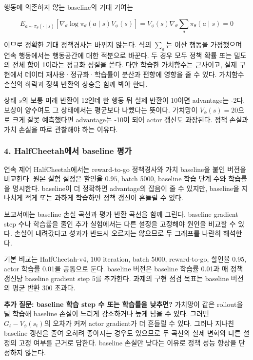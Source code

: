 \documentclass[11pt,a4paper]{article}
\begin{document}
행동에 의존하지 않는 baseline의 기대 기여는\par

\[
E_{a\sim\pi_\theta(\cdot\mid s)}
[\nabla_\theta\log\pi_\theta(a\mid s)V_\phi(s)]
=V_\phi(s)\nabla_\theta\sum_a\pi_\theta(a\mid s)=0
\]

이므로 정확한 기대 정책경사는 바뀌지 않는다. 식의 $\sum_a$는 이산 행동을 가정했으며 연속 행동에서는 행동공간에 대한 적분으로 바꾼다. 두 경우 모두 정책 확률 또는 밀도의 전체 합이 1이라는 정규화 성질을 쓴다. 다만 학습한 가치함수는 근사이고, 실제 구현에서 데이터 재사용·정규화·학습률이 분산과 편향에 영향을 줄 수 있다. 가치함수 손실의 하락과 정책 반환의 상승을 함께 봐야 한다.\par

상태 $s$의 보통 미래 반환이 12인데 한 행동 뒤 실제 반환이 10이면 advantage는 -2다. 보상이 양수여도 그 상태에서는 평균보다 나빴다는 뜻이다. 가치망이 $V_\phi(s)=20$으로 크게 잘못 예측했다면 advantage는 -10이 되어 actor 갱신도 과장된다. 정책 손실과 가치 손실을 따로 관찰해야 하는 이유다.\par

\subsubsection{4. HalfCheetah에서 baseline 평가}

연속 제어 HalfCheetah에서는 reward-to-go 정책경사와 가치 baseline을 붙인 버전을 비교한다. 원본 실험 설정은 할인율 $0.95$, batch 5000, baseline 학습 단계 수와 학습률을 명시한다. baseline이 더 정확하면 advantage의 잡음이 줄 수 있지만, baseline을 지나치게 적게 또는 과하게 학습하면 정책 갱신이 흔들릴 수 있다.\par

보고서에는 baseline 손실 곡선과 평가 반환 곡선을 함께 그린다. baseline gradient step 수나 학습률을 줄인 추가 실험에서는 다른 설정을 고정해야 원인을 비교할 수 있다. 손실이 내려갔다고 성과가 반드시 오르지는 않으므로 두 그래프를 나란히 해석한다.\par

기본 비교는 HalfCheetah-v4, 100 iteration, batch 5000, reward-to-go, 할인율 0.95, actor 학습률 0.01을 공통으로 둔다. baseline 버전은 baseline 학습률 0.01과 매 정책 갱신당 baseline gradient step 5를 추가한다. 과제의 구현 점검 목표는 baseline 버전의 평균 반환 300 초과다.\par

\textbf{추가 질문: baseline 학습 step 수 또는 학습률을 낮추면?} 가치망이 같은 rollout을 덜 학습해 baseline 손실이 느리게 감소하거나 높게 남을 수 있다. 그러면 $G_t-V_\phi(s_t)$의 오차가 커져 actor gradient가 더 흔들릴 수 있다. 그러나 지나친 baseline 갱신을 줄여 오히려 좋아지는 경우도 있으므로 두 곡선의 실제 변화와 다른 설정의 고정 여부를 근거로 답한다. baseline 손실만 낮다는 이유로 정책 성능 향상을 단정하지 않는다.\par
\end{document}
